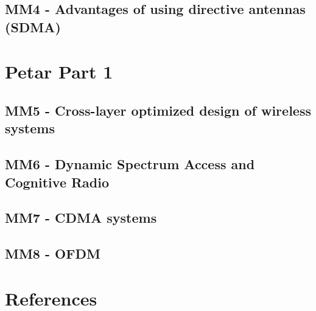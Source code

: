 \chapter{MM4 - Advantages of using directive antennas (SDMA)}





\part{Petar Part 1}
\chapter{MM5 - Cross-layer optimized design of wireless systems}






\chapter{MM6 - Dynamic Spectrum Access and Cognitive Radio}


\chapter{MM7 - CDMA systems}



\chapter{MM8 - OFDM}


\part{References}






